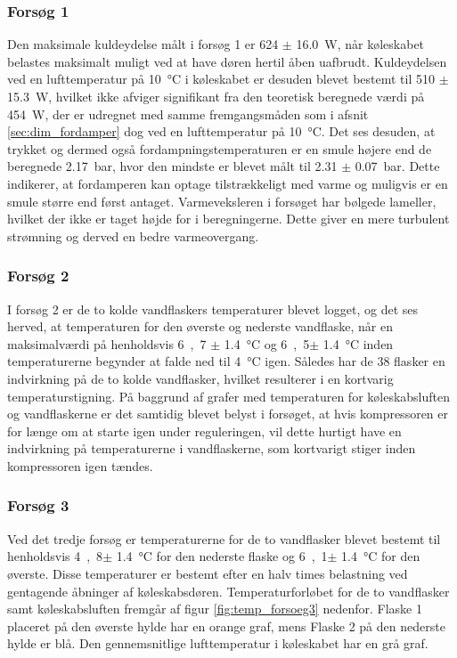 \documentclass[../Hovedrapport.tex]{subfiles}
\begin{document}
\subsubsection*{Forsøg 1}
Den maksimale kuldeydelse målt i forsøg 1 er \si{624} $\pm$ \SI{16,0}{W}, når køleskabet belastes maksimalt muligt ved at have døren hertil åben uafbrudt. Kuldeydelsen ved en lufttemperatur på \SI{10}{\celsius} i køleskabet er desuden blevet bestemt til \si{510} $\pm$ \SI{15,3}{W}, hvilket ikke afviger signifikant fra den teoretisk beregnede værdi på \SI{454}{W}, der er udregnet med samme fremgangsmåden som i afsnit \ref{sec:dim_fordamper} dog ved en lufttemperatur på \SI{10}{\celsius}. Det ses desuden, at trykket og dermed også fordampningstemperaturen er en smule højere end de beregnede \SI{2,17}{bar}, hvor den mindste er blevet målt til \SI{2,31}{} $\pm$ \SI{0,07}{bar}. Dette indikerer, at fordamperen kan optage tilstrækkeligt med varme og muligvis er en smule større end først antaget. Varmeveksleren i forsøget har bølgede lameller, hvilket der ikke er taget højde for i beregningerne. Dette giver en mere turbulent strømning og derved en bedre varmeovergang. 

\subsubsection*{Forsøg 2}
I forsøg 2 er de to kolde vandflaskers temperaturer blevet logget, og det ses herved, at temperaturen for den øverste og nederste vandflaske, når en maksimalværdi på henholdsvis \si{6,7} $\pm$ \SI{1,4}{\celsius} og \si{6,5}$\pm$ \SI{1,4}{\celsius} inden temperaturerne begynder at falde ned til \SI{4}{\celsius} igen. Således har de 38 flasker en indvirkning på de to kolde vandflasker, hvilket resulterer i en kortvarig temperaturstigning. På baggrund af grafer med temperaturen for køleskabsluften og vandflaskerne er det samtidig blevet belyst i forsøget, at hvis kompressoren er for længe om at starte igen under reguleringen, vil dette hurtigt have en indvirkning på temperaturerne i vandflaskerne, som kortvarigt stiger inden kompressoren igen tændes.   

\subsubsection*{Forsøg 3}
Ved det tredje forsøg er temperaturerne for de to vandflasker blevet bestemt til henholdsvis \si{4,8}$\pm$ \SI{1,4}{\celsius} for den nederste flaske og \si{6,1}$\pm$ \SI{1,4}{\celsius} for den øverste. Disse temperaturer er bestemt efter en halv times belastning ved gentagende åbninger af køleskabsdøren. Temperaturforløbet for de to vandflasker samt køleskabsluften fremgår af figur \ref{fig:temp_forsoeg3} nedenfor. Flaske 1 placeret på den øverste hylde har en orange graf, mens Flaske 2 på den nederste hylde er blå. Den gennemsnitlige lufttemperatur i køleskabet har en grå graf. 
\end{document}
